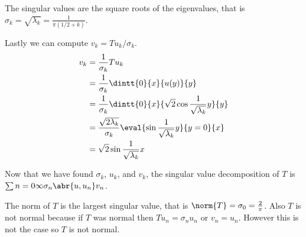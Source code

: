 \documentclass[11pt, oneside]{article}
\begin{document}
\begin{enumerate}
    The singular values are the square roots of the eigenvalues, that is
    $\sigma_k = \sqrt{\lambda_k} = \frac{1}{\pi(1/2 + k)}$.

    Lastly we can compute $v_k = Tu_k/\sigma_k$.
    \begin{align*}
      v_k &= \frac{1}{\sigma_k} Tu_k \\
      &= \frac{1}{\sigma_k} \dintt{0}{x}{u(y)}{y} \\
      &= \frac{1}{\sigma_k} \dintt{0}{x}{\sqrt{2} \cos{\frac{1}{\sqrt{\lambda_k}} y}}{y} \\
      &= \frac{\sqrt{2\lambda_k}}{\sigma_k} \eval{\sin{\frac{1}{\sqrt{\lambda_k}} y}}{y=0}{x} \\
      &= \sqrt{2} \sin{\frac{1}{\sqrt{\lambda_k}} x} \\
    \end{align*}

    Now that we have found $\sigma_k$, $u_k$, and $v_k$, the singular value
    decomposition of $T$ is $\sum{n = 0}{\infty}{\sigma_n \abr{u, u_n} v_n}$.

    The norm of $T$ is the largest singular value, that is
    $\norm{T} = \sigma_0 = \frac{2}{\pi}$.
    Also $T$ is not normal because if $T$ was normal then $Tu_n = \sigma_n u_n$
    or $v_n = u_n$.
    However this is not the case so $T$ is not normal.
\end{enumerate}

\pagebreak
\end{document}
